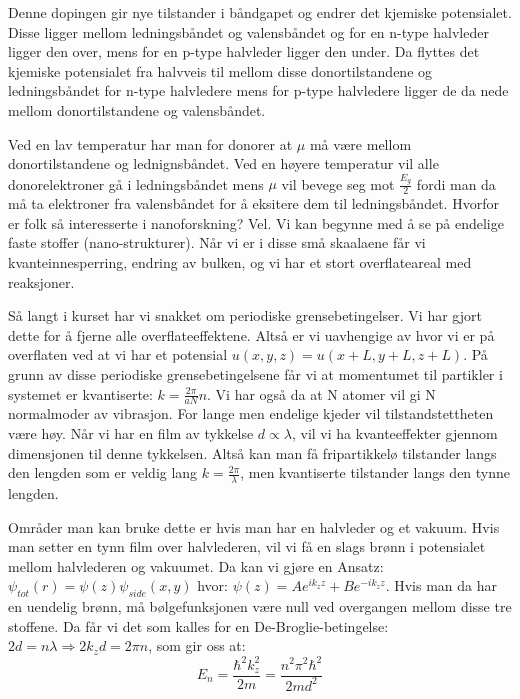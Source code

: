 \documentclass{article}
\begin{document}
Denne dopingen gir nye tilstander i båndgapet og endrer det kjemiske potensialet. Disse ligger mellom ledningsbåndet og valensbåndet og for en n-type halvleder ligger den over, mens for en p-type halvleder ligger den under. Da flyttes det kjemiske potensialet fra halvveis til mellom disse donortilstandene og ledningsbåndet for n-type halvledere mens for p-type halvledere ligger de da nede mellom donortilstandene og  valensbåndet.

Ved en lav temperatur har man for donorer at $\mu$ må være mellom donortilstandene og lednignsbåndet. Ved en høyere temperatur vil alle donorelektroner gå i ledningsbåndet mens $\mu$ vil bevege seg mot $\frac{E_g}{2}$ fordi man da må ta elektroner fra valensbåndet for å eksitere dem til ledningsbåndet.
Hvorfor er  folk så interesserte i nanoforskning? Vel. Vi kan begynne med å se på endelige faste stoffer (nano-strukturer). Når vi er i disse små skaalaene får vi kvanteinnesperring, endring av bulken, og vi har et stort overflateareal med reaksjoner.

Så langt i kurset har vi snakket om periodiske grensebetingelser. Vi har gjort dette for å fjerne alle overflateeffektene. Altså er vi uavhengige av hvor vi er på overflaten ved at vi har et potensial $u(x,y,z)=u(x+L,y+L,z+L)$. På grunn av disse periodiske grensebetingelsene får vi at momentumet til partikler i systemet er kvantiserte: $k = \frac{2 \pi}{a N} n$. Vi har også da at N atomer vil gi N normalmoder av vibrasjon. For lange men endelige kjeder vil tilstandstettheten være høy. Når vi har en film av tykkelse $d \propto \lambda$, vil vi ha kvanteeffekter gjennom dimensjonen til denne tykkelsen. Altså kan man få fripartikkelø tilstander langs den lengden som er veldig lang $k = \frac{2\pi}{\lambda}$, men kvantiserte tilstander langs den tynne lengden.

Områder man kan bruke dette er hvis man har en halvleder og et vakuum. Hvis man setter en tynn film over halvlederen, vil vi få en slags brønn i potensialet mellom halvlederen og vakuumet. Da kan vi gjøre en Ansatz: $\psi_{tot}(r) = \psi(z) \psi_{side}(x,y)$ hvor: $\psi(z) = Ae^{ik_z z}+Be^{-ik_z z}$. Hvis man da har en uendelig brønn, må bølgefunksjonen være null ved overgangen mellom disse tre stoffene. Da får vi det som kalles for en De-Broglie-betingelse: $2d = n\lambda \Rightarrow 2k_z d = 2\pi n$, som gir oss at:
\begin{equation*}
  E_n = \frac{\hbar^2 k_z^2}{2m} = \frac{n^2 \pi^2 \hbar^2}{2m d^2}
\end{equation*}
\end{document}
